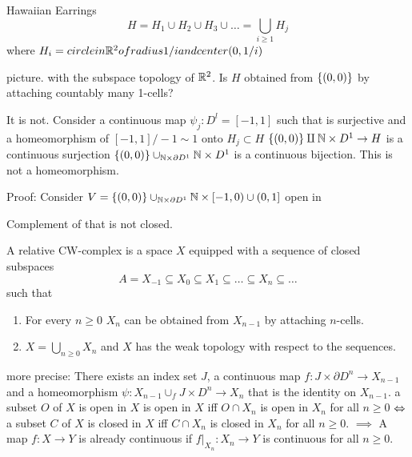 \documentclass{TemplateLecture}
\begin{document}
\begin{bsp}
    Hawaiian Earrings
    \[H = H_1 \cup H_2 \cup H_3 \cup \dots = \bigcup_{i \geq 1} H_j\]
    where \(H_i = circle in \mathbb{R}^2 of radius 1/i and center (0,1/i)\)

    picture. 
    with the subspace topology of \(\mathbb{R}^2\). Is \(H\) obtained from \(\{(0,0)\}\) by attaching countably many 1-cells?

    It is not.
    Consider a continuous map \(\psi_j\colon D^l = [-1,1]\) such that is surjective and a homeomorphism of \([-1,1]/-1\sim 1\) onto  \(H_j \subset H\)
    \(\{(0,0)\} \amalg \mathbb{N} \times D^1 \to H\) is a continuous surjection%
    \(\{(0,0)\} \cup_{\mathbb{N}\times \partial D^1} \mathbb{N} \times D^1\) is a continuous bijection.
    This is not a homeomorphism.

    Proof: Consider \(V = \{(0,0)\} \cup_{\mathbb{N} \times \partial D^1} \mathbb{N} \times [-1,0) \cup (0,1]\) open in 

    Complement of that is not closed.
\end{bsp}

\begin{defi}{}{}
    A relative CW-complex is a space \(X\) equipped with a sequence of closed subspaces
    \[A = X_{-1} \subseteq X_0 \subseteq X_1 \subseteq \dots \subseteq X_n \subseteq \dots \]
    such that
    \begin{enumerate}
        \item For every \(n \geq 0\) \(X_n\) can be obtained from \(X_{n-1}\) by attaching \(n\)-cells.
        \item \(X = \bigcup_{n \geq 0} X_n\) and \(X\) has the weak topology with respect to the sequences.
    \end{enumerate}

    more precise:
    There exists an index set \(J\), a continuous map \(f \colon J \times \partial D^n \to X_{n-1}\) and a homeomorphism \(\psi\colon X_{n-1} \cup_f J\times D^n \to X_n\) that is the identity on \(X_{n-1}\).
    a subset \(O\) of \(X\) is open in \(X\) is open in \(X\) iff \(O\cap X_n\) is open in \(X_n\) for all \(n \geq 0\) \(\Leftrightarrow\) a subset \(C\) of \(X\) is closed in \(X\) iff \(C\cap X_n\) is closed in \(X_n\) for all \(n \geq 0\).
    \(\implies\) A map \(f\colon X\to Y\) is already continuous if \(f\rvert_{X_n}\colon X_n \to Y\) is continuous for all \(n \geq 0\).
\end{defi}
\end{document}
